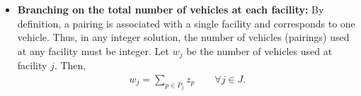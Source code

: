 \begin {itemize}
\item [{\bf Rule 2}]

  {\bf Branching on the total number of vehicles at each facility:} 
  By definition, a pairing is associated with a single facility and corresponds to one vehicle.  
  Thus, in any integer solution, the number of vehicles (pairings) used at any facility must be 
  integer. Let $w_j$ be the number of vehicles used at facility $j$.  Then,  
  \begin{eqnarray}
    \label{n-equal}
    w_j =\sum_{p \in P_j} z_{p} \qquad \forall j \in J. 
  \end{eqnarray}
 

\end{itemize}
